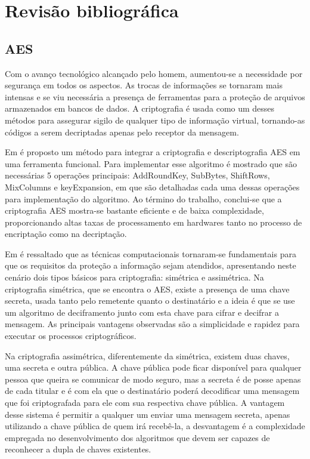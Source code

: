 \chapter{Revisão bibliográfica}

\section{AES}

Com o avanço tecnológico alcançado pelo homem, aumentou-se a necessidade por segurança em todos os aspectos. As trocas de informações se tornaram mais intensas e se viu necessária a presença de ferramentas para a proteção de arquivos armazenados em bancos de dados. A criptografia é usada como um desses métodos para assegurar sigilo de qualquer tipo de informação virtual, tornando-as códigos a serem decriptadas apenas pelo receptor da mensagem. 

Em \cite{lu2002integrated} é proposto um método para integrar a criptografia e descriptografia AES em uma ferramenta funcional. Para implementar esse algoritmo é mostrado que são necessárias 5 operações principais: AddRoundKey, SubBytes, ShiftRows, MixColumns e keyExpansion, em que são detalhadas cada uma dessas operações para implementação do algoritmo. Ao término do trabalho, conclui-se que a criptografia AES mostra-se bastante eficiente e de baixa complexidade, proporcionando altas taxas de processamento em hardwares tanto no processo de encriptação como na decriptação.

Em \cite{oliveira2012criptografia} é ressaltado que as técnicas computacionais tornaram-se fundamentais para que os requisitos da proteção a informação sejam atendidos, apresentando neste cenário dois tipos básicos para criptografia: simétrica e assimétrica.
Na criptografia simétrica, que se encontra o AES, existe a presença de uma chave secreta, usada tanto pelo remetente quanto o destinatário e a ideia é que se use um algoritmo de deciframento junto com esta chave para cifrar e decifrar a mensagem. As principais vantagens observadas são a simplicidade e rapidez para executar os processos criptográficos.

Na criptografia assimétrica, diferentemente da simétrica, existem duas chaves, uma secreta e outra pública. A chave pública pode ficar disponível para qualquer pessoa que queira se comunicar de modo seguro, mas a secreta é de posse apenas de cada titular e é com ela que o destinatário poderá decodificar uma mensagem que foi criptografada para ele com sua respectiva chave pública. A vantagem desse sistema é permitir a qualquer um enviar uma mensagem secreta, apenas utilizando a chave pública de quem irá recebê-la, a desvantagem é a complexidade empregada no desenvolvimento dos algoritmos que devem ser capazes de reconhecer a dupla de chaves existentes.

